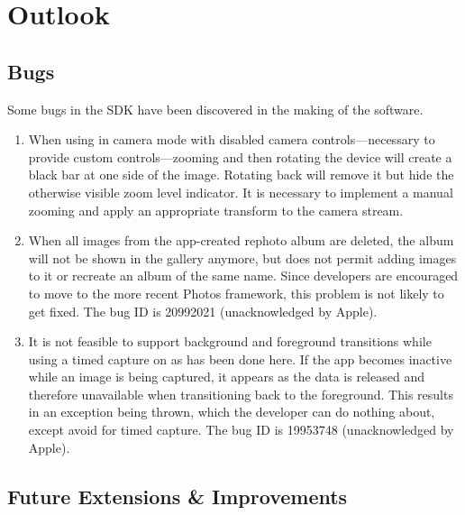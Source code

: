 \chapter{Outlook}

\section{Bugs}

Some bugs in the SDK have been discovered in the making of the software.
\begin{enumerate}

   \item When using  in camera mode with disabled
      camera controls---necessary to provide custom controls---zooming and then
      rotating the device will create a black bar at one side of the image.
      Rotating back will remove it but hide the otherwise visible zoom level
      indicator. It is necessary to implement a manual zooming and apply an
      appropriate transform to the camera stream.

   \item When all images from the app-created rephoto album are deleted, the
      album will not be shown in the gallery anymore, but 
      does not permit adding images to it or recreate an album of the same name.
      Since developers are encouraged to move to the more recent Photos
      framework, this problem is not likely to get fixed. The bug ID is
      20992021 (unacknowledged by Apple).

   \item It is not feasible to support background and foreground transitions
      while using a timed capture on  as has been
      done here. If the app becomes inactive while an image is being captured,
      it appears as the data is released and therefore unavailable when
      transitioning back to the foreground. This results in an exception being
      thrown, which the developer can do nothing about, except avoid
       for timed capture. The bug ID is 19953748
      (unacknowledged by Apple).
\end{enumerate}
\section{Future Extensions \& Improvements}

